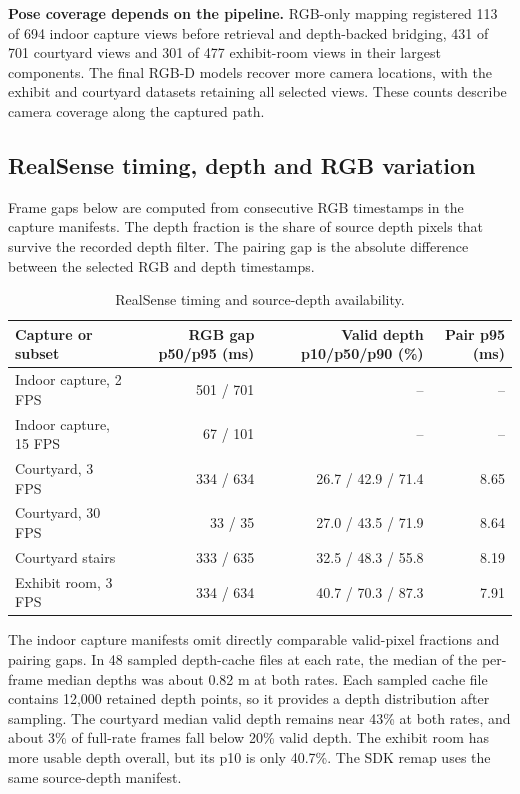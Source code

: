 \documentclass[11pt,a4paper]{article}
\begin{document}
\medskip
\textbf{Pose coverage depends on the pipeline.} RGB-only mapping registered
113 of 694 indoor capture views before retrieval and depth-backed bridging, 431 of
701 courtyard views and 301 of 477 exhibit-room views in their largest
components. The final RGB-D models recover more camera locations, with
the exhibit and courtyard datasets retaining all selected views. These
counts describe camera coverage along the captured path.

\clearpage
\subsection{RealSense timing, depth and RGB variation}
Frame gaps below are computed from consecutive RGB timestamps in the
capture manifests. The depth fraction is the share of source depth pixels
that survive the recorded depth filter. The pairing gap is the absolute
difference between the selected RGB and depth timestamps.

\begin{table}[!ht]
\centering\small
\begin{tabularx}{\linewidth}{@{}Yrrr@{}}
\toprule
\textbf{Capture or subset} & \textbf{RGB gap p50/p95 (ms)} & \textbf{Valid depth p10/p50/p90 (\%)} & \textbf{Pair p95 (ms)} \\
\midrule
Indoor capture, 2 FPS & 501 / 701 & -- & -- \\
Indoor capture, 15 FPS & 67 / 101 & -- & -- \\
Courtyard, 3 FPS & 334 / 634 & 26.7 / 42.9 / 71.4 & 8.65 \\
Courtyard, 30 FPS & 33 / 35 & 27.0 / 43.5 / 71.9 & 8.64 \\
Courtyard stairs & 333 / 635 & 32.5 / 48.3 / 55.8 & 8.19 \\
Exhibit room, 3 FPS & 334 / 634 & 40.7 / 70.3 / 87.3 & 7.91 \\
\bottomrule
\end{tabularx}
\caption{RealSense timing and source-depth availability.}
\label{tab:rgbd-metadata}
\end{table}

The indoor capture manifests omit directly comparable valid-pixel fractions and
pairing gaps. In 48 sampled depth-cache files at each rate, the median of
the per-frame median depths was about 0.82 m at both rates. Each sampled cache file
contains 12,000 retained depth points, so it provides a depth distribution
after sampling. The courtyard median valid depth remains near 43\% at both
rates, and about 3\% of full-rate frames fall below 20\% valid depth. The
exhibit room has more usable depth overall, but its p10 is only 40.7\%.
The SDK remap uses the same source-depth manifest.
\end{document}
